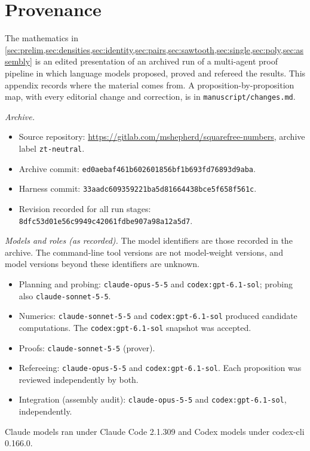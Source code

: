 \section{Provenance}\label{app:provenance}

The mathematics in \cref{sec:prelim,sec:densities,sec:identity,sec:pairs,sec:sawtooth,sec:single,sec:poly,sec:assembly} is an edited presentation of an archived run of a multi-agent proof pipeline in which language models proposed, proved and refereed the results. This appendix records where the material comes from. A proposition-by-proposition map, with every editorial change and correction, is in \texttt{manuscript/changes.md}.

\emph{Archive.}
\begin{itemize}
\item Source repository: \url{https://gitlab.com/mshepherd/squarefree-numbers}, archive label \texttt{zt-neutral}.
\item Archive commit: \texttt{ed0aebaf461b602601856bf1b693fd76893d9aba}.
\item Harness commit: \texttt{33aadc609359221ba5d81664438bce5f658f561c}.
\item Revision recorded for all run stages: \texttt{8dfc53d01e56c9949c42061fdbe907a98a12a5d7}.
\end{itemize}

\emph{Models and roles (as recorded).} The model identifiers are those recorded in the archive. The command-line tool versions are not model-weight versions, and model versions beyond these identifiers are unknown.
\begin{itemize}[before=\raggedright]
\item Planning and probing: \texttt{claude-opus-5-5} and \texttt{codex:gpt-6.1-sol}; probing also \texttt{claude-sonnet-5-5}.
\item Numerics: \texttt{claude-sonnet-5-5} and \texttt{codex:gpt-6.1-sol} produced candidate computations. The \texttt{codex:gpt-6.1-sol} snapshot was accepted.
\item Proofs: \texttt{claude-sonnet-5-5} (prover).
\item Refereeing: \texttt{claude-opus-5-5} and \texttt{codex:gpt-6.1-sol}. Each proposition was reviewed independently by both.
\item Integration (assembly audit): \texttt{claude-opus-5-5} and \texttt{codex:gpt-6.1-sol}, independently.
\end{itemize}
Claude models ran under Claude Code 2.1.309 and Codex models under codex-cli 0.166.0.

